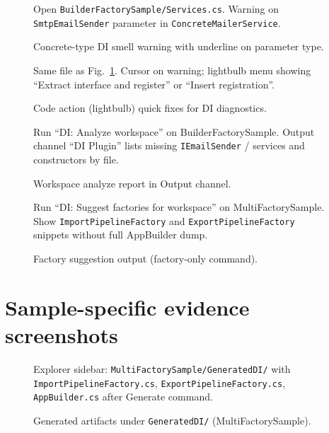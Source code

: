 \begin{figure}[htbp]
\centering
{}%
{Open \texttt{BuilderFactorySample/Services.cs}. Warning on \texttt{SmtpEmailSender} parameter in \texttt{ConcreteMailerService}.}
\caption{Concrete-type DI smell warning with underline on parameter type.}
\label{fig:problems-concrete}
\end{figure}

\begin{figure}[htbp]
\centering
{}%
{Same file as Fig.~\ref{fig:problems-concrete}. Cursor on warning; lightbulb menu showing ``Extract interface and register'' or ``Insert registration''.}
\caption{Code action (lightbulb) quick fixes for DI diagnostics.}
\label{fig:quick-fix}
\end{figure}

\begin{figure}[htbp]
\centering
{}%
{Run ``DI: Analyze workspace'' on BuilderFactorySample. Output channel ``DI Plugin'' lists missing \texttt{IEmailSender} / services and constructors by file.}
\caption{Workspace analyze report in Output channel.}
\label{fig:output-analyze}
\end{figure}

\begin{figure}[htbp]
\centering
{}%
{Run ``DI: Suggest factories for workspace'' on MultiFactorySample. Show \texttt{ImportPipelineFactory} and \texttt{ExportPipelineFactory} snippets without full AppBuilder dump.}
\caption{Factory suggestion output (factory-only command).}
\label{fig:output-factories}
\end{figure}

\section{Sample-specific evidence screenshots}

\begin{figure}[htbp]
\centering
{}%
{Explorer sidebar: \texttt{MultiFactorySample/GeneratedDI/} with \texttt{ImportPipelineFactory.cs}, \texttt{ExportPipelineFactory.cs}, \texttt{AppBuilder.cs} after Generate command.}
\caption{Generated artifacts under \texttt{GeneratedDI/} (MultiFactorySample).}
\label{fig:explorer-generated}
\end{figure}

